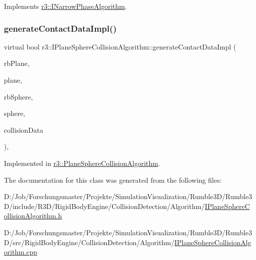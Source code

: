 Implements \mbox{\hyperlink{classr3_1_1_i_narrow_phase_algorithm_a606fe8de5fe81ff45fedb81ca74717c3}{r3\+::\+I\+Narrow\+Phase\+Algorithm}}.

\mbox{\label{classr3_1_1_i_plane_sphere_collision_algorithm_a92ddfd3ba00ed53b183a6aef41b04a60}} 
\subsubsection{\texorpdfstring{generate\+Contact\+Data\+Impl()}{generateContactDataImpl()}}
{\footnotesize\ttfamily virtual bool r3\+::\+I\+Plane\+Sphere\+Collision\+Algorithm\+::generate\+Contact\+Data\+Impl (\begin{DoxyParamCaption}\item[{\mbox{\hyperlink{classr3_1_1_rigid_body}{Rigid\+Body}} $\ast$}]{rb\+Plane,  }\item[{\mbox{\hyperlink{classr3_1_1_collision_plane}{Collision\+Plane}} $\ast$}]{plane,  }\item[{\mbox{\hyperlink{classr3_1_1_rigid_body}{Rigid\+Body}} $\ast$}]{rb\+Sphere,  }\item[{\mbox{\hyperlink{classr3_1_1_collision_sphere}{Collision\+Sphere}} $\ast$}]{sphere,  }\item[{\mbox{\hyperlink{classr3_1_1_collision_data}{Collision\+Data}} \&}]{collision\+Data }\end{DoxyParamCaption})\hspace{0.3cm}{\ttfamily [protected]}, {}}



Implemented in \mbox{\hyperlink{classr3_1_1_plane_sphere_collision_algorithm_a6823dc80b23ce77beabd26a9c2a9d9ed}{r3\+::\+Plane\+Sphere\+Collision\+Algorithm}}.



The documentation for this class was generated from the following files\+:\begin{DoxyCompactItemize}
\item 
D\+:/\+Job/\+Forschungsmaster/\+Projekte/\+Simulation\+Visualization/\+Rumble3\+D/\+Rumble3\+D/include/\+R3\+D/\+Rigid\+Body\+Engine/\+Collision\+Detection/\+Algorithm/\mbox{\hyperlink{_i_plane_sphere_collision_algorithm_8h}{I\+Plane\+Sphere\+Collision\+Algorithm.\+h}}\item 
D\+:/\+Job/\+Forschungsmaster/\+Projekte/\+Simulation\+Visualization/\+Rumble3\+D/\+Rumble3\+D/src/\+Rigid\+Body\+Engine/\+Collision\+Detection/\+Algorithm/\mbox{\hyperlink{_i_plane_sphere_collision_algorithm_8cpp}{I\+Plane\+Sphere\+Collision\+Algorithm.\+cpp}}\end{DoxyCompactItemize}
